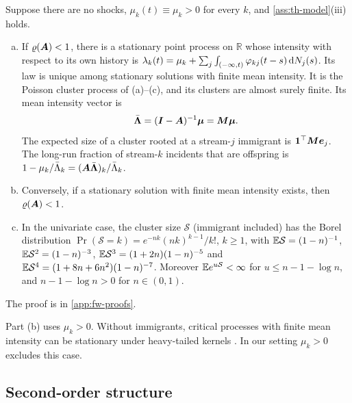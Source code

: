 \begin{proposition}\label{prop:stationary}
Suppose there are no shocks, $\mu_k(t)\equiv\mu_k>0$ for every $k$, and
\cref{ass:th-model}(iii) holds.
\begin{enumerate}[(a)]
  \item If $\varrho(\bm{A})<1$, there is a stationary point process on $\mathbb R$ whose
    intensity with respect to its own history is
    $\lambda_k(t)=\mu_k+\sum_j\int_{(-\infty,t)}\varphi_{kj}(t-s)\,\mathrm{d}N_j(s)$. Its law is
    unique among stationary solutions with finite mean intensity. It is the Poisson
    cluster process of (a)--(c), and its clusters are almost surely finite. Its mean
    intensity vector is
    \[
    \bar{\bm\Lambda}=(\bm{I}-\bm{A})^{-1}\bm\mu=\bm{M}\bm\mu .
    \]
    The expected size of a cluster rooted at a stream-$j$ immigrant is
    $\mathbf 1^{\top}\bm{M}\bm e_j$. The long-run fraction of stream-$k$ incidents that
    are offspring is $1-\mu_k/\bar\Lambda_k=(\bm{A}\bar{\bm\Lambda})_k/\bar\Lambda_k$.
  \item Conversely, if a stationary solution with finite mean intensity exists, then
    $\varrho(\bm{A})<1$.
  \item In the univariate case, the cluster size $\mathcal S$ (immigrant included) has the
    Borel distribution
    $\Pr(\mathcal S=k)=e^{-nk}(nk)^{k-1}/k!$, $k\ge1$, with $\mathbb{E} \mathcal S=(1-n)^{-1}$,
    $\mathbb{E} \mathcal S^2=(1-n)^{-3}$, $\mathbb{E} \mathcal S^3=(1+2n)(1-n)^{-5}$ and
    $\mathbb{E} \mathcal S^4=(1+8n+6n^2)(1-n)^{-7}$. Moreover $\mathbb{E} e^{u \mathcal S}<\infty$ for
    $u\le n-1-\log n$, and $n-1-\log n>0$ for $n\in(0,1)$.
\end{enumerate}
\end{proposition}

The proof is in \cref{app:fw-proofs}.

Part (b) uses $\mu_k>0$. Without immigrants, critical processes with finite mean
intensity can be stationary under heavy-tailed kernels \citep{bremaud2001}. In our
setting $\mu_k>0$ excludes this case.

\subsection{Second-order structure}\label{sec:th-second}

